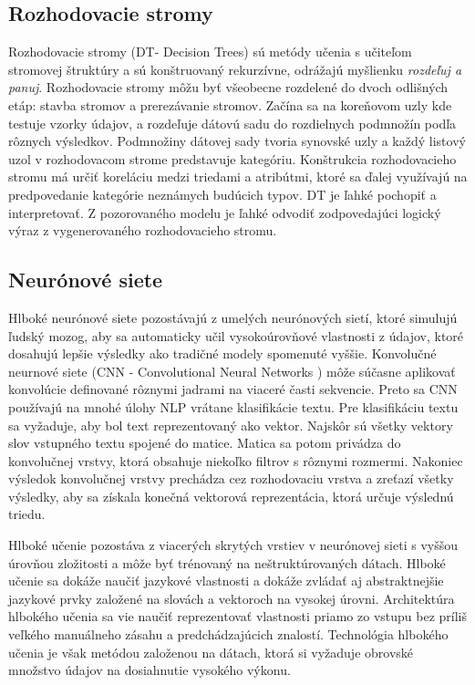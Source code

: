 \subsection*{Rozhodovacie stromy}
Rozhodovacie stromy (DT- Decision Trees) sú metódy učenia s učiteľom stromovej štruktúry a sú konštruovaný rekurzívne, odrážajú myšlienku \textit{rozdeľuj a panuj}. Rozhodovacie stromy môžu byť všeobecne rozdelené do dvoch odlišných etáp: stavba stromov a prerezávanie stromov. Začína sa na koreňovom uzly kde testuje vzorky údajov, a rozdeľuje dátovú sadu do rozdielnych podmnožín podľa rôznych výsledkov. Podmnožiny dátovej sady tvoria synovské uzly a každý listový uzol v rozhodovacom strome predstavuje kategóriu. Konštrukcia rozhodovacieho stromu má určiť koreláciu medzi triedami a atribútmi, ktoré sa ďalej využívajú na predpovedanie kategórie neznámych budúcich typov. DT je ľahké pochopiť a interpretovať. Z pozorovaného modelu je ľahké odvodiť zodpovedajúci logický výraz z vygenerovaného rozhodovacieho stromu.

\subsection*{Neurónové siete}
Hlboké neurónové siete pozostávajú z umelých neurónových sietí, ktoré simulujú ľudský mozog, aby sa automaticky učil vysokoúrovňové vlastnosti z údajov, ktoré dosahujú lepšie výsledky ako tradičné modely spomenuté vyššie. Konvolučné neurnové siete (CNN - Convolutional Neural Networks ) môže súčasne aplikovať konvolúcie definované rôznymi jadrami na viaceré časti sekvencie. Preto sa CNN používajú na mnohé úlohy NLP vrátane klasifikácie textu. Pre klasifikáciu textu sa vyžaduje, aby bol text reprezentovaný ako vektor. Najskôr sú všetky vektory slov vstupného textu spojené do matice. Matica sa potom privádza do konvolučnej vrstvy, ktorá obsahuje niekoľko filtrov s rôznymi rozmermi. Nakoniec výsledok konvolučnej vrstvy prechádza cez rozhodovaciu vrstva a zreťazí všetky výsledky, aby sa získala konečná vektorová reprezentácia, ktorá určuje výslednú triedu. 

Hlboké učenie pozostáva z viacerých skrytých vrstiev v neurónovej sieti s vyššou úrovňou zložitosti a môže byť trénovaný na neštruktúrovaných dátach. Hlboké učenie sa dokáže naučiť jazykové vlastnosti a dokáže zvládať aj abstraktnejšie jazykové prvky založené na slovách a vektoroch na vysokej úrovni. Architektúra hlbokého učenia sa vie naučiť reprezentovať vlastnosti priamo zo vstupu bez príliš veľkého manuálneho zásahu a predchádzajúcich znalostí. Technológia hlbokého učenia je však metódou založenou na dátach, ktorá si vyžaduje obrovské množstvo údajov na dosiahnutie vysokého výkonu. 

